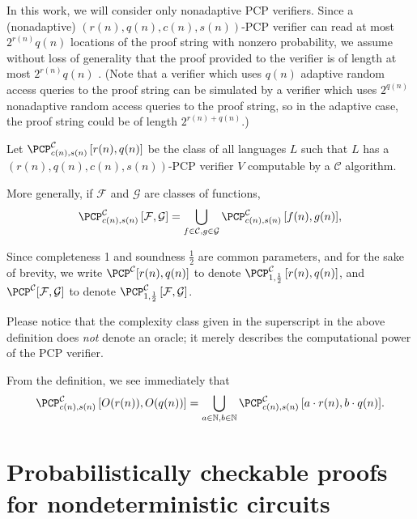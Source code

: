 \documentclass{article}
\newcommand{\PCPcs}[5]{\PCP^{#1}_{#2, #3}\left[#4, #5\right]}
\begin{document}
In this work, we will consider only nonadaptive PCP verifiers.
Since a (nonadaptive) $(r(n), q(n), c(n), s(n))$-PCP verifier can read at most $2^{r(n)} q(n)$ locations of the proof string with nonzero probability, we assume without loss of generality that the proof provided to the verifier is of length at most $2^{r(n)} q(n)$ \cite[Remark~11.6]{ab09}.
(Note that a verifier which uses $q(n)$ adaptive random access queries to the proof string can be simulated by a verifier which uses $2^{q(n)}$ nonadaptive random access queries to the proof string, so in the adaptive case, the proof string could be of length $2^{r(n) + q(n)}$.)

\begin{definition}
  Let $\PCPcs{\mathcal{C}}{c(n)}{s(n)}{r(n)}{q(n)}$ be the class of all languages $L$ such that $L$ has a $(r(n), q(n), c(n), s(n))$-PCP verifier $V$ computable by a $\mathcal{C}$ algorithm.

  More generally, if $\mathcal{F}$ and $\mathcal{G}$ are classes of functions,
  \begin{equation*}
    \PCPcs{\mathcal{C}}{c(n)}{s(n)}{\mathcal{F}}{\mathcal{G}} = \bigcup_{f \in \mathcal{C}, g \in \mathcal{G}}{\PCPcs{\mathcal{C}}{c(n)}{s(n)}{f(n)}{g(n)}},
    \end{equation*}

  Since completeness 1 and soundness $\frac{1}{2}$ are common parameters, and for the sake of brevity, we write $\PCP^{\mathcal{C}}[r(n), q(n)]$ to denote $\PCPcs{\mathcal{C}}{1}{\frac{1}{2}}{r(n)}{q(n)}$, and $\PCP^{\mathcal{C}}[\mathcal{F}, \mathcal{G}]$ to denote $\PCPcs{\mathcal{C}}{1}{\frac{1}{2}}{\mathcal{F}}{\mathcal{G}}$.
\end{definition}

Please notice that the complexity class given in the superscript in the above definition does \emph{not} denote an oracle; it merely describes the computational power of the PCP verifier.

From the definition, we see immediately that
\begin{equation*}
  \PCPcs{\mathcal{C}}{c(n)}{s(n)}{O(r(n))}{O(q(n))} = \bigcup_{a \in \mathbb{N}, b \in \mathbb{N}}{\PCPcs{\mathcal{C}}{c(n)}{s(n)}{a \cdot r(n)}{b \cdot q(n)}}.
\end{equation*}

\section{Probabilistically checkable proofs for nondeterministic circuits}
\end{document}
